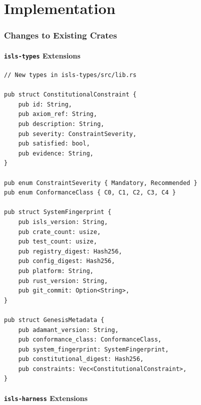 \documentclass[11pt,a4paper,twoside]{article}
\theoremstyle{definition}
\theoremstyle{plain}
\theoremstyle{remark}
\begin{document}
\part{Implementation}\label{part:impl}

\section{Changes to Existing Crates}\label{sec:changes}

\subsection{\texttt{isls-types} Extensions}

\begin{lstlisting}
// New types in isls-types/src/lib.rs

pub struct ConstitutionalConstraint {
    pub id: String,
    pub axiom_ref: String,
    pub description: String,
    pub severity: ConstraintSeverity,
    pub satisfied: bool,
    pub evidence: String,
}

pub enum ConstraintSeverity { Mandatory, Recommended }
pub enum ConformanceClass { C0, C1, C2, C3, C4 }

pub struct SystemFingerprint {
    pub isls_version: String,
    pub crate_count: usize,
    pub test_count: usize,
    pub registry_digest: Hash256,
    pub config_digest: Hash256,
    pub platform: String,
    pub rust_version: String,
    pub git_commit: Option<String>,
}

pub struct GenesisMetadata {
    pub adamant_version: String,
    pub conformance_class: ConformanceClass,
    pub system_fingerprint: SystemFingerprint,
    pub constitutional_digest: Hash256,
    pub constraints: Vec<ConstitutionalConstraint>,
}
\end{lstlisting}

\subsection{\texttt{isls-harness} Extensions}
\end{document}
